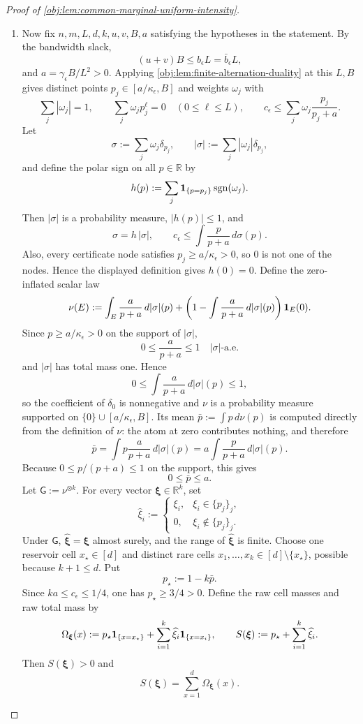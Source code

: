 \documentclass[11pt]{article}
\begin{document}
\begin{proof}[Proof of \cref{obj:lem:common-marginal-uniform-intensity}]
\begin{enumerate}
\item Now fix \(n,m,L,d,k,u,v,B,a\) satisfying the hypotheses in the statement. By the bandwidth slack,
\[
(u+v)B\le b_\epsilon L=\bar b_\epsilon L,
\]
and \(a=\gamma_\epsilon B/L^2>0\). Applying \cref{obj:lem:finite-alternation-duality} at this \(L,B\) gives distinct points \(p_j\in[a/\kappa_\epsilon,B]\) and weights \(\omega_j\) with
\[
\sum_j|\omega_j|=1,\qquad
\sum_j \omega_j p_j^\ell=0\quad(0\le \ell\le L),
\qquad
c_\epsilon\le
\sum_j\omega_j\frac{p_j}{p_j+a}.
\]
Let
\[
\sigma:=\sum_j\omega_j\delta_{p_j},
\qquad
|\sigma|:=\sum_j|\omega_j|\delta_{p_j},
\]
and define the polar sign on all \(p\in\mathbb R\) by
\[
h(p):=\sum_j {\bf 1}_{\{p=p_j\}}\operatorname{sgn}(\omega_j).
\]
Then \(|\sigma|\) is a probability measure, \(|h(p)|\le1\), and
\[
\sigma=h\,|\sigma|,\qquad
c_\epsilon\le \int \frac{p}{p+a}\,d\sigma(p).
\]
Also, every certificate node satisfies \(p_j\ge a/\kappa_\epsilon>0\), so \(0\) is not one of the nodes. Hence the displayed definition gives \(h(0)=0\).
Define the zero-inflated scalar law
\[
\nu(E)
:=
\int_E \frac{a}{p+a}\,d|\sigma|(p)
+
\left(1-\int \frac{a}{p+a}\,d|\sigma|(p)\right){\bf 1}_E(0).
\]
Since \(p\ge a/\kappa_\epsilon>0\) on the support of \(|\sigma|\),
\[
0\le \frac{a}{p+a}\le 1
\quad |\sigma|\text{-a.e.}
\]
and \(|\sigma|\) has total mass one. Hence
\[
0\le \int \frac{a}{p+a}\,d|\sigma|(p)\le 1,
\]
so the coefficient of \(\delta_0\) is nonnegative and \(\nu\) is a probability measure supported on
\(\{0\}\cup[a/\kappa_\epsilon,B]\). Its mean \(\bar p:=\int p\,d\nu(p)\) is computed directly from the definition of \(\nu\): the atom at zero contributes nothing, and therefore
\[
\bar p
=
\int p\frac{a}{p+a}\,d|\sigma|(p)
=
a\int \frac{p}{p+a}\,d|\sigma|(p).
\]
Because \(0\le p/(p+a)\le1\) on the support, this gives
\[
0\le\bar p\le a .
\]
Let \(\mathsf G:=\nu^{\otimes k}\). For every vector \(\boldsymbol\xi\in\mathbb R^k\), set
\[
\widehat\xi_i
:=
\begin{cases}
\xi_i,& \xi_i\in\{p_j\}_j,\\
0,& \xi_i\notin\{p_j\}_j .
\end{cases}
\]
Under \(\mathsf G\), \(\widehat{\boldsymbol\xi}=\boldsymbol\xi\) almost surely, and the range of \(\widehat{\boldsymbol\xi}\) is finite. Choose one reservoir cell \(x_\star\in[d]\) and distinct rare cells \(x_1,\ldots,x_k\in[d]\setminus\{x_\star\}\), possible because \(k+1\le d\). Put
\[
p_\star:=1-k\bar p .
\]
Since \(k a\le c_\epsilon\le1/4\), one has \(p_\star\ge3/4>0\). Define the raw cell masses and raw total mass by
\[
\Omega_{\boldsymbol\xi}(x)
:=
p_\star{\bf 1}_{\{x=x_\star\}}
+\sum_{i=1}^k \widehat\xi_i{\bf 1}_{\{x=x_i\}},
\qquad
S(\boldsymbol\xi)
:=
p_\star+\sum_{i=1}^k\widehat\xi_i .
\]
Then \(S(\boldsymbol\xi)>0\) and
\[
S(\boldsymbol\xi)=\sum_{x=1}^d\Omega_{\boldsymbol\xi}(x).
\]


\end{enumerate}
\end{proof}
\end{document}
